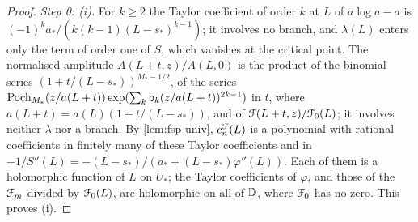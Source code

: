 \begin{proof}
\emph{Step 0: (i).} For $k\geq 2$ the Taylor coefficient of order $k$ at $L$ of $a\log a-a$ is $(-1)^ka_*/(k(k-1)(L-s_*)^{k-1})$; it involves no branch, and $\lambda(L)$ enters only the term of order one of $S$, which vanishes at the critical point. The normalised amplitude $A(L+t,z)/A(L,0)$ is the product of the binomial series $(1+t/(L-s_*))^{M_*-1/2}$, of the series $\mathrm{Poch}_{M_*}(z/a(L+t))\exp(\sum_k\mathsf{b}_k(z/a(L+t))^{2k-1})$ in $t$, where $a(L+t)=a(L)(1+t/(L-s_*))$, and of $\mathcal{F}(L+t,z)/\mathcal{F}_0(L)$; it involves neither $\lambda$ nor a branch. By \cref{lem:fsp-univ}, $c^{\mathcal{F}}_n(L)$ is a polynomial with rational coefficients in finitely many of these Taylor coefficients and in $-1/S''(L)=-(L-s_*)/(a_*+(L-s_*)\varphi''(L))$. Each of them is a holomorphic function of $L$ on $U_*$; the Taylor coefficients of $\varphi$, and those of the $\mathcal{F}_m$ divided by $\mathcal{F}_0(L)$, are holomorphic on all of $\mathbb{D}$, where $\mathcal{F}_0$ has no zero. This proves (i).


\end{proof}
